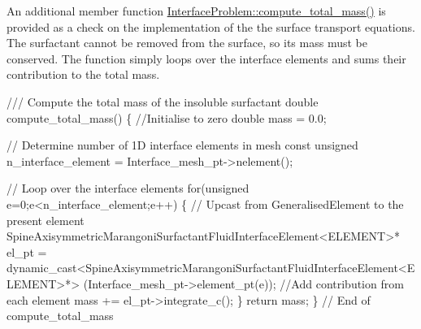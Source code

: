 An additional member function {\ttfamily \hyperlink{classInterfaceProblem_a9b19bc90667fe8c7885d8ee113812e27}{Interface\+Problem\+::compute\+\_\+total\+\_\+mass()}} is provided as a check on the implementation of the the surface transport equations. The surfactant cannot be removed from the surface, so its mass must be conserved. The function simply loops over the interface elements and sums their contribution to the total mass.  
\begin{DoxyCodeInclude}
 \textcolor{comment}{/// Compute the total mass of the insoluble surfactant}
 \textcolor{keywordtype}{double} compute\_total\_mass()
  \{
   \textcolor{comment}{//Initialise to zero}
   \textcolor{keywordtype}{double} mass = 0.0;
   
   \textcolor{comment}{// Determine number of 1D interface elements in mesh}
   \textcolor{keyword}{const} \textcolor{keywordtype}{unsigned} n\_interface\_element = Interface\_mesh\_pt->nelement();
   
   \textcolor{comment}{// Loop over the interface elements}
   \textcolor{keywordflow}{for}(\textcolor{keywordtype}{unsigned} e=0;e<n\_interface\_element;e++)
    \{
     \textcolor{comment}{// Upcast from GeneralisedElement to the present element}
     SpineAxisymmetricMarangoniSurfactantFluidInterfaceElement<ELEMENT>* el\_pt = 
      \textcolor{keyword}{dynamic\_cast<}SpineAxisymmetricMarangoniSurfactantFluidInterfaceElement<ELEMENT>*\textcolor{keyword}{>}
      (Interface\_mesh\_pt->element\_pt(e));
     \textcolor{comment}{//Add contribution from each element}
     mass += el\_pt->integrate\_c();
    \}
   \textcolor{keywordflow}{return} mass;
  \} \textcolor{comment}{// End of compute\_total\_mass}

\end{DoxyCodeInclude}




 

